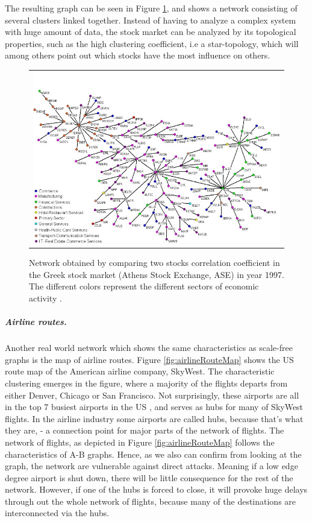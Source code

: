 The resulting graph can be seen in Figure \ref{fig:greekStockMarket}, and shows a network consisting of several clusters linked together. Instead of having to analyze a complex system with huge amount of data, the stock market can be analyzed by its topological properties, such as the high clustering coefficient, i.e a star-topology, which will among others point out which stocks have the most influence on others. 
\begin{figure}[h]
\centering
\begin{tabular}{@{}c@{}}
\includegraphics[width=1.0\textwidth]{../Figures/greekStockMarket.jpg}
\end{tabular}
\caption[Caption for LOF]{Network obtained by comparing two stocks correlation coefficient in the Greek stock market (Athens Stock Exchange, ASE) in year 1997. The different colors represent the different sectors of economic activity \cite{greekStockMarket}.
\label{fig:greekStockMarket}}
\end{figure}

\subparagraph{Airline routes.}
Another real world network which shows the same characteristics as scale-free graphs is the map of airline routes. Figure \ref{fig:airlineRouteMap} shows the US route map of the American airline company, SkyWest. The characteristic clustering emerges in the figure, where a majority of the flights departs from either Denver, Chicago or San Francisco. Not surprisingly, these airports are all in the top 7 busiest airports in the US \cite{busiestAirports}, and serves as hubs for many of SkyWest flights. In the airline industry some airports are called hubs, because that's what they are, - a connection point for major parts of the network of flights. The network of flights, as depicted in Figure \ref{fig:airlineRouteMap} follows the characteristics of A-B graphs. Hence, as we also can confirm from looking at the graph, the network are vulnerable against direct attacks. Meaning if a low edge degree airport is shut down, there will be little consequence for the rest of the network. However, if one of the hubs is forced to close, it will provoke huge delays through out the whole network of flights, because many of the destinations are interconnected via the hubs. 



